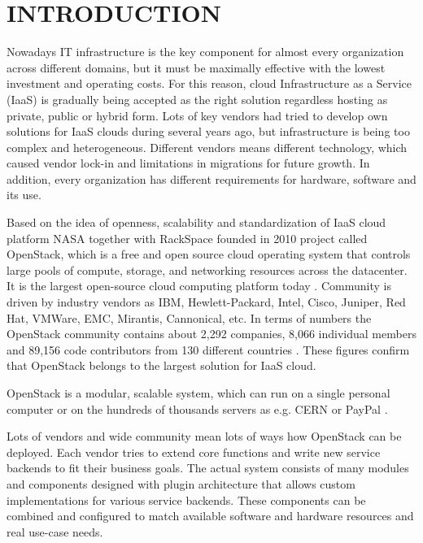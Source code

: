 
\section{INTRODUCTION}


Nowadays IT infrastructure is the key component for almost every organization across different domains, but it must be maximally effective with the lowest investment and operating costs.
For this reason, cloud Infrastructure as a Service (IaaS) is gradually being accepted as the right solution regardless hosting as private, public or hybrid form. Lots of key vendors had tried to develop own solutions for IaaS clouds during several years ago,
but infrastructure is being too complex and heterogeneous. Different vendors means different technology, which caused vendor lock-in and limitations in migrations for future growth. In addition, every organization has different requirements for hardware, software and its use. 

Based on the idea of openness, scalability and standardization of IaaS cloud platform NASA together with RackSpace founded in 2010 project called OpenStack, which is a free and open source cloud operating system that controls large pools of compute, storage, and networking resources across the
datacenter. It is the largest open-source cloud computing platform today \cite{OpenStack}. Community is driven by industry vendors as IBM, Hewlett-Packard, Intel, Cisco, Juniper, Red Hat, VMWare, EMC, Mirantis, Cannonical, etc. In terms of numbers the OpenStack community contains about 2,292 companies, 8,066 individual members and 89,156 code contributors from 130 different countries \cite{STACKALYTICS}.
These figures confirm that OpenStack belongs to the largest solution for IaaS cloud.

OpenStack is a modular, scalable system, which can run on a single personal computer or on the hundreds of thousands servers as e.g. CERN \cite{CERN} or PayPal \cite{PayPal}.

Lots of vendors and wide community mean lots of ways how OpenStack can be deployed.
Each vendor tries to extend core functions and write new service backends to fit their business goals. The actual system consists of many modules and components designed with plugin architecture that allows custom implementations for various service backends. These components can be combined and configured to match available software and hardware resources and real use-case needs.

